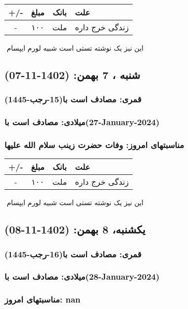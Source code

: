 \documentclass{article}
\newcommand{\rnote}[1]{\marginpar{\textcolor{color}{\StrSubstitute{\##1}{ }{\_}}}}
\newcommand{\myRow}[4]{
    #1 & #2 & #3 & #4 \\ \hline
}
\begin{document}
\begin{tabular}{ | c | c | c | p{5cm} |}
    \hline
    \myRow{ +/- }{مبلغ}{بانک}{علت}
    \myRow{-}{۱۰۰}{ملت}{زندگی خرج داره}
\end{tabular}
\newline
\newline

‌
\rnote{تست}
این نیز یک نوشته تستی است شبیه لورم ایپسام




\newpage
{}
\textcolor{color}{
\section{ شنبه ، 7 بهمن: (1402-11-07) }
\subsubsection*{قمری: مصادف است با(15-رجب-1445)} 
\subsubsection*{میلادی: مصادف است با(27-January-2024)}
\subsubsection*{مناسبتهای امروز: وفات حضرت زینب سلام الله علیها}
}


\begin{tabular}{ | c | c | c | p{5cm} |}
    \hline
    \myRow{ +/- }{مبلغ}{بانک}{علت}
    \myRow{-}{۱۰۰}{ملت}{زندگی خرج داره}
\end{tabular}
\newline
\newline

‌
\rnote{تست}
این نیز یک نوشته تستی است شبیه لورم ایپسام




\newpage
{}
\textcolor{color}{
\section{ یکشنبه، 8 بهمن: (1402-11-08) }
\subsubsection*{قمری: مصادف است با(16-رجب-1445)} 
\subsubsection*{میلادی: مصادف است با(28-January-2024)}
\subsubsection*{مناسبتهای امروز: nan}
}
\end{document}
